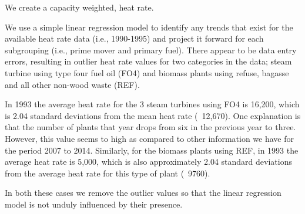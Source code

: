 \documentclass[10pt]{amsart}
\begin{document}
We create a capacity weighted, heat rate.

We use a simple linear regression model to identify any trends that exist for the available heat rate data (i.e., 1990-1995) and project it forward for each subgrouping (i.e., prime mover and primary fuel). 
There appear to be data entry errors, resulting in outlier heat rate values for two categories in the data; steam turbine using type four fuel oil (FO4) and biomass plants using refuse, bagasse and all other non-wood waste (REF). 

In 1993 the average heat rate for the 3 steam turbines using FO4 is 16,200, which is 2.04 standard deviations from the mean heat rate (~12,670). One explanation is that the number of plants that year drops from six in the previous year to three. However, this value seems to high as compared to other information we have for the period 2007 to 2014. Similarly, for the biomass plants using REF, in 1993 the average heat rate is 5,000, which is also approximately 2.04 standard deviations from the average heat rate for this type of plant (~9760). 

In both these cases we remove the outlier values so that the linear regression model is not unduly influenced by their presence. 
\end{document}
